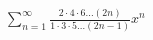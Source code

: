 \item $\displaystyle\sum_{n=1}^\infty \frac{2 \cdot 4 \cdot 6 \dots (2n)}{1 \cdot 3 \cdot 5 \dots (2n-1)} x^n$
